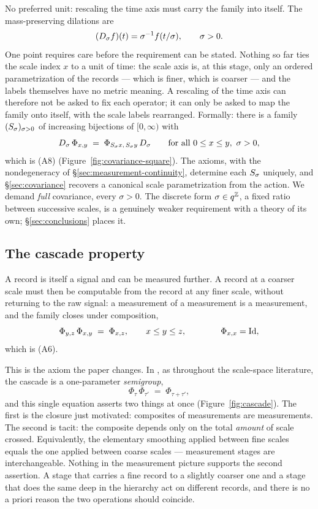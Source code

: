 No preferred unit: rescaling the time axis must carry the family into itself. The
mass-preserving dilations are
\[
  (D_\sigma f)(t) = \sigma^{-1} f(t/\sigma), \qquad \sigma > 0 .
\]
One point requires care before the requirement can be stated. Nothing so far ties the scale
index $x$ to a unit of time: the scale axis is, at this stage, only an ordered
parametrization of the records --- which is finer, which is coarser --- and the labels
themselves have no metric meaning. A rescaling of the time axis can therefore not be
asked to fix each operator; it can only be asked to map the family onto itself, with the
scale labels rearranged. Formally: there is a family $(S_\sigma)_{\sigma>0}$ of
increasing bijections of $[0,\infty)$ with
\[
  D_\sigma\,\Phi_{x,y} \;=\; \Phi_{S_\sigma x,\,S_\sigma y}\,D_\sigma
  \qquad \text{for all } 0 \le x \le y,\ \sigma > 0,
\]
which is (A8) (Figure~\ref{fig:covariance-square}). The axioms, with the nondegeneracy
of \S\ref{sec:measurement-continuity}, determine each $S_\sigma$ uniquely, and
\S\ref{sec:covariance} recovers a canonical scale parametrization from the action. We
demand \emph{full} covariance, every $\sigma > 0$. The discrete form
$\sigma \in q^{\mathbb{Z}}$, a fixed ratio between successive scales, is a genuinely weaker
requirement with a theory of its own; \S\ref{sec:conclusions} places it.



\subsection{The cascade property}\label{sec:measurement-cascade}

A record is itself a signal and can be measured further. A record at a coarser scale must
then be computable from the record at any finer scale, without returning to the raw
signal: a measurement of a measurement is a measurement, and the family closes under
composition,
\[
  \Phi_{y,z}\,\Phi_{x,y} \;=\; \Phi_{x,z}, \qquad x \le y \le z,
  \qquad\qquad \Phi_{x,x} = \mathrm{Id},
\]
which is (A6).



This is the axiom the paper changes. In , as throughout
the scale-space literature, the cascade is a one-parameter \emph{semigroup},
\[
  \Phi_\tau\,\Phi_{\tau'} \;=\; \Phi_{\tau + \tau'},
\]
and this single equation asserts two things at once (Figure~\ref{fig:cascade}). The
first is the closure just motivated: composites of measurements are measurements. The
second is tacit: the composite depends only on the total \emph{amount} of scale crossed.
Equivalently, the elementary smoothing applied between fine scales equals the one applied
between coarse scales --- measurement stages are interchangeable. Nothing in the
measurement picture supports the second assertion. A stage that carries a fine record to
a slightly coarser one and a stage that does the same deep in the hierarchy act on
different records, and there is no a priori reason the two operations should coincide.


